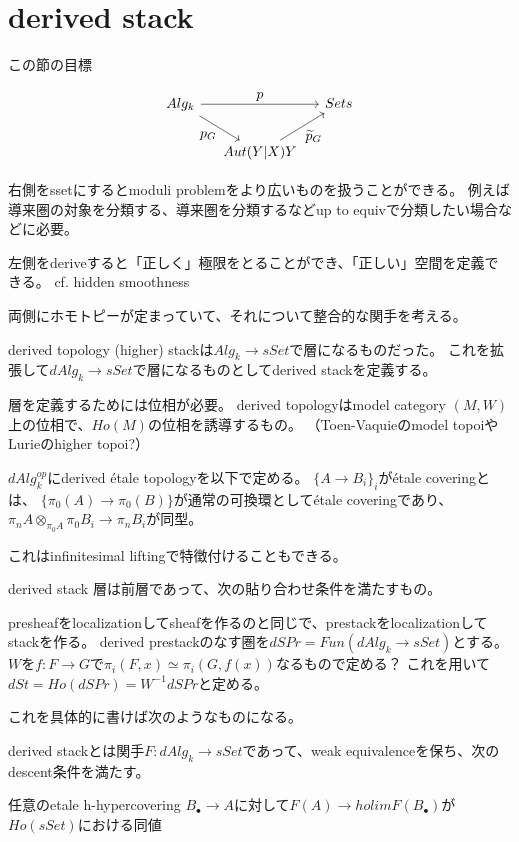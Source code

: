 \documentclass[dvipdfmx]{beamer}
\begin{document}
\section{derived stack}

\begin{frame}[fragile]{この節の目標}

\[\begin{tikzcd}[column sep=small]
Alg_k \ar[dr, "\displaystyle{p_G}"'] \ar[rr, "\displaystyle{p}"]& &  Sets \\
& Aut(Y|X) Y \ar[ur, "\displaystyle{\widetilde{p}_G}"'] &
\end{tikzcd}\]

右側をssetにするとmoduli problemをより広いものを扱うことができる。
例えば導来圏の対象を分類する、導来圏を分類するなどup to equivで分類したい場合などに必要。

左側をderiveすると「正しく」極限をとることができ、「正しい」空間を定義できる。
cf. hidden smoothness

両側にホモトピーが定まっていて、それについて整合的な関手を考える。
\end{frame}

\begin{frame}{derived topology}
(higher) stackは$Alg_k \to sSet$で層になるものだった。
これを拡張して$dAlg_k \to sSet$で層になるものとしてderived stackを定義する。

層を定義するためには位相が必要。
derived topologyはmodel category $(M,W)$上の位相で、$Ho(M)$の位相を誘導するもの。
（Toen-Vaquieのmodel topoiやLurieのhigher topoi?）

\begin{dfn}
$dAlg_k^{op}$にderived \'etale topologyを以下で定める。
$\{A \to B_i\}_i$が\'etale coveringとは、
$\{\pi_0(A) \to \pi_0(B)\}$が通常の可換環として\'etale coveringであり、$\pi_nA \otimes_{\pi_0A}\pi_0B_i \to \pi_nB_i$が同型。
\end{dfn}

これはinfinitesimal liftingで特徴付けることもできる。
\end{frame}

\begin{frame}{derived stack}
層は前層であって、次の貼り合わせ条件を満たすもの。

presheafをlocalizationしてsheafを作るのと同じで、prestackをlocalizationしてstackを作る。
derived prestackのなす圏を$dSPr=Fun(dAlg_k \to sSet)$とする。
$W$を$f:F \to G$で$\pi_i(F,x)\simeq \pi_i(G,f(x)) $なるもので定める？
これを用いて$dSt=Ho(dSPr)=W^{-1}dSPr$と定める。

これを具体的に書けば次のようなものになる。
\begin{dfn}
derived stackとは関手$F:dAlg_k \to sSet$であって、weak equivalenceを保ち、次のdescent条件を満たす。

任意のetale h-hypercovering $B_\bullet \to A$に対して$F(A) \to holim F(B_\bullet)$が$Ho(sSet)$における同値
\end{dfn}
\end{frame}
\end{document}
